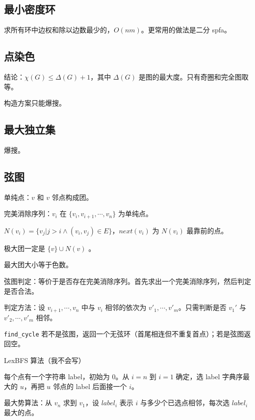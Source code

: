 \documentclass[12pt]{ctexart}
\begin{document}
\subsection{最小密度环}

求所有环中边权和除以边数最少的，$O(nm)$。更常用的做法是二分 spfa。




\subsection{点染色}

结论：$\chi(G)\le \Delta(G)+1$，其中 $\Delta(G)$ 是图的最大度。只有奇圈和完全图取等。

构造方案只能爆搜。



\subsection{最大独立集}

爆搜。



\subsection{弦图}

单纯点：$v$ 和 $v$ 邻点构成团。

完美消除序列：$v_i$ 在 $\{v_i,v_{i+1},\cdots,v_n\}$ 为单纯点。

$N(v_i)=\{v_j|j>i\land (v_i,v_j)\in E\}$，$next(v_i)$ 为 $N(v_i)$ 最靠前的点。

极大团一定是 $\{v\}\cup N(v)$ 。

最大团大小等于色数。

弦图判定：等价于是否存在完美消除序列。首先求出一个完美消除序列，然后判定是否合法。

判定方法：设 $v_{i+1},\cdots,v_n$ 中与 $v_i$ 相邻的依次为 $v'_1,\cdots,v'_m$。只需判断是否 $v_1'$ 与 $v'_2,\cdots,v'_m$ 相邻。

\verb|find_cycle| 若不是弦图，返回一个无弦环（首尾相连但不重复首点）；若是弦图返回空。

LexBFS 算法（我不会写）

每个点有一个字符串 label，初始为 $0$。从 $i=n$ 到 $i=1$ 确定，选 label 字典序最大的 $u$，再把 $u$ 邻点的 label 后面接一个 $i$。

最大势算法：从 $v_n$ 求到 $v_1$，设 $label_i$ 表示 $i$ 与多少个已选点相邻，每次选 $label_i$ 最大的点。
\end{document}
